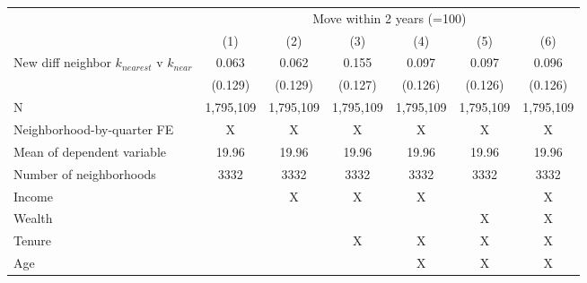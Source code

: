 \begin{tabular}{lcccccc}
\toprule
 & \multicolumn{6}{c}{Move within 2 years (=100)}  \\ 
\cmidrule(lr){2-7}
  & (1) & (2) & (3) & (4) & (5) & (6) \\ 
\midrule
New diff neighbor $k_{nearest}$ v $k_{near}$ & 0.063 & 0.062 & 0.155 & 0.097 & 0.097 & 0.096 \\ 
 & (0.129) & (0.129) & (0.127) & (0.126) & (0.126) & (0.126) \\ 
 \midrule
N & 1,795,109 & 1,795,109 & 1,795,109 & 1,795,109 & 1,795,109 & 1,795,109 \\ 
Neighborhood-by-quarter FE & X & X & X & X & X & X \\ 
Mean of dependent variable & 19.96 & 19.96 & 19.96 & 19.96 & 19.96 & 19.96 \\ 
Number of neighborhoods & 3332 & 3332 & 3332 & 3332 & 3332 & 3332 \\ 
Income &  & X & X & X &  & X \\ 
Wealth &  &  &  &  & X & X \\ 
Tenure &  &  & X & X & X & X \\ 
Age &  &  &  & X & X & X \\ 
\bottomrule
\end{tabular}